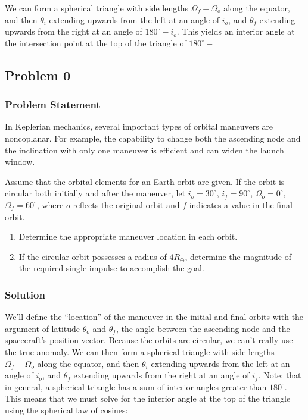 We can form a spherical triangle with side lengths $\Omega_f - \Omega_o$ along the equator, and then $\theta_i$ extending upwards from the left at an angle of $i_o$, and $\theta_f$ extending upwards from the right at an angle of $180^\circ-i_o$. This yields an interior angle at the intersection point at the top of the triangle of $180^\circ-$

\subsection{Problem 0}

\subsubsection{Problem Statement}

In Keplerian mechanics, several important types of orbital maneuvers are noncoplanar. For example, the capability to change both the ascending node and the inclination with only one maneuver is efficient and can widen the launch window.

Assume that the orbital elements for an Earth orbit are given. If the orbit is circular both initially and after the maneuver, let $i_o=30^\circ$, $i_f=90^\circ$, $\Omega_o=0^\circ$, $\Omega_f=60^\circ$, where $o$ reflects the original orbit and $f$ indicates a value in the final orbit.

\begin{enumerate}
    \item Determine the appropriate maneuver location in each orbit.
    \item If the circular orbit possesses a radius of $4R_\oplus$, determine the magnitude of the required single impulse to accomplish the goal.
\end{enumerate}

\subsubsection{Solution}

We'll define the ``location'' of the maneuver in the initial and final orbits with the argument of latitude $\theta_o$ and $\theta_f$, the angle between the ascending node and the spacecraft's position vector. Because the orbits are circular, we can't really use the true anomaly. We can then form a spherical triangle with side lengths $\Omega_f - \Omega_o$ along the equator, and then $\theta_i$ extending upwards from the left at an angle of $i_o$, and $\theta_f$ extending upwards from the right at an angle of $i_f$. Note: that in general, a spherical triangle has a sum of interior angles greater than $180^\circ$. This means that we must solve for the interior angle at the top of the triangle using the spherical law of cosines:

